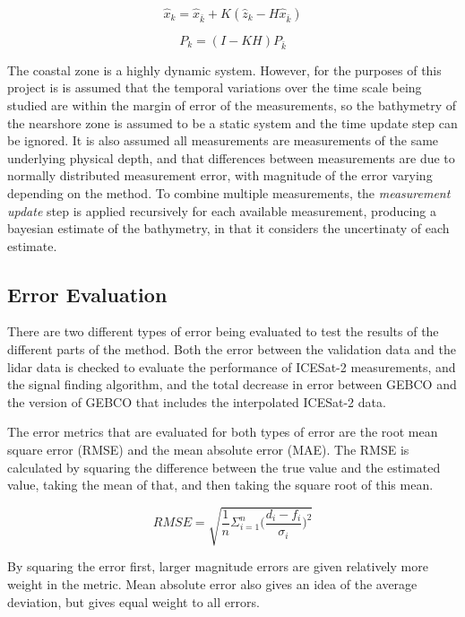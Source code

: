 \begin{equation}
    \hat{x}_k = \hat{x}_{\bar{k}} + K(\hat{z}_k - H \hat{x}_{\bar{k}})
\end{equation}

\begin{equation}
    P_k = (I - KH)P_{\bar{k}}
\end{equation}


The coastal zone is a highly dynamic system. However, for the purposes of this project is is assumed that the temporal variations over the time scale being studied are within the margin of error of the measurements, so the bathymetry of the nearshore zone is assumed to be a static system and the time update step can be ignored. It is also assumed all measurements are measurements of the same underlying physical depth, and that differences between measurements are due to normally distributed measurement error, with magnitude of the error varying depending on the method. To combine multiple measurements, the \emph{measurement update} step is applied recursively for each available measurement, producing a bayesian estimate of the bathymetry, in that it considers the uncertinaty of each estimate. 

\subsection{Error Evaluation}

There are two different types of error being evaluated to test the results of the different parts of the method. Both the error between the validation data and the lidar data is checked to evaluate the performance of ICESat-2 measurements, and the signal finding algorithm, and the total decrease in error between GEBCO and the version of GEBCO that includes the interpolated ICESat-2 data. 

The error metrics that are evaluated for both types of error are the root mean square error (RMSE) and the mean absolute error (MAE). The RMSE is calculated by squaring the difference between the true value and the estimated value, taking the mean of that, and then taking the square root of this mean.

$$  RMSE = \sqrt{\frac{1}{n}\Sigma_{i=1}^{n}{\Big(\frac{d_i -f_i}{\sigma_i}\Big)^2}}  $$

By squaring the error first, larger magnitude errors are given relatively more weight in the metric. Mean absolute error also gives an idea of the average deviation, but gives equal weight to all errors.

